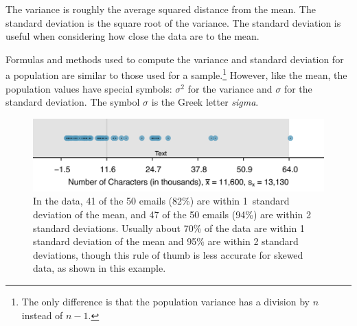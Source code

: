 \begin{termBox}{
The variance is roughly the average squared distance from the mean. The standard deviation is the square root of the variance. The standard deviation is useful when considering how close the data are to the mean.}
\end{termBox}

Formulas and methods used to compute the variance and standard deviation for a population are similar to those used for a sample.\footnote{The only difference is that the population variance has a division by $n$ instead of $n-1$.} However, like the mean, the population values have special symbols: $\sigma_{}^2$ for the variance and $\sigma$ for the standard deviation. The symbol $\sigma$  is the Greek letter \emph{sigma}.


\begin{figure}
\centering
\includegraphics[width=\mycaptionwidth]{ch_intro_to_data/figures/sdAsRuleForEmailNumChar/sdAsRuleForEmailNumChar}
\caption{In the  data, 41 of the 50 emails (82\%) are within 1~standard deviation of the mean, and 47 of the 50 emails (94\%) are within 2 standard deviations. Usually about 70\% of the data are within 1 standard deviation of the mean and 95\% are within 2 standard deviations, though this rule of thumb is less accurate for skewed data, as shown in this example.}
\label{sdAsRuleForEmailNumChar}
\end{figure}

